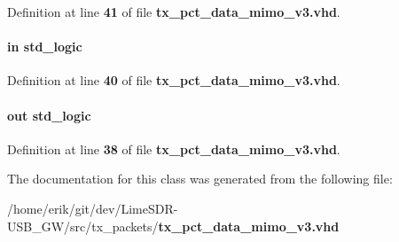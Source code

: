 Definition at line {\bf 41} of file {\bf tx\+\_\+pct\+\_\+data\+\_\+mimo\+\_\+v3.\+vhd}.

\paragraph[{tx\+\_\+en}]{ {\bfseries \textcolor{keywordflow}{in}\textcolor{vhdlchar}{ }} {\bfseries \textcolor{comment}{std\+\_\+logic}\textcolor{vhdlchar}{ }} \hspace{0.3cm}{\ttfamily [Port]}}\label{classtx__pct__data__mimo__v3_a844b5ac3b04ba9f57e4bcb2edcede053}


Definition at line {\bf 40} of file {\bf tx\+\_\+pct\+\_\+data\+\_\+mimo\+\_\+v3.\+vhd}.

\paragraph[{tx\+\_\+outfifo\+\_\+rdy}]{ {\bfseries \textcolor{keywordflow}{out}\textcolor{vhdlchar}{ }} {\bfseries \textcolor{comment}{std\+\_\+logic}\textcolor{vhdlchar}{ }} \hspace{0.3cm}{\ttfamily [Port]}}\label{classtx__pct__data__mimo__v3_a97619b0e6bd83cf1b714dfc609a56a82}


Definition at line {\bf 38} of file {\bf tx\+\_\+pct\+\_\+data\+\_\+mimo\+\_\+v3.\+vhd}.



The documentation for this class was generated from the following file\+:\begin{DoxyCompactItemize}
\item 
/home/erik/git/dev/\+Lime\+S\+D\+R-\/\+U\+S\+B\+\_\+\+G\+W/src/tx\+\_\+packets/{\bf tx\+\_\+pct\+\_\+data\+\_\+mimo\+\_\+v3.\+vhd}\end{DoxyCompactItemize}
